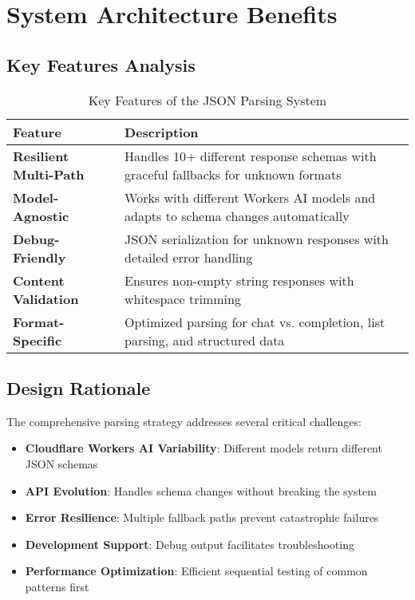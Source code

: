 \documentclass[11pt,a4paper]{article}
\begin{document}
\section{System Architecture Benefits}

\subsection{Key Features Analysis}

\begin{table}[h!]
\centering
\begin{tabular}{|p{3cm}|p{10cm}|}
\hline
\textbf{Feature} & \textbf{Description} \\
\hline
\textbf{Resilient Multi-Path} & Handles 10+ different response schemas with graceful fallbacks for unknown formats \\
\hline
\textbf{Model-Agnostic} & Works with different Workers AI models and adapts to schema changes automatically \\
\hline
\textbf{Debug-Friendly} & JSON serialization for unknown responses with detailed error handling \\
\hline
\textbf{Content Validation} & Ensures non-empty string responses with whitespace trimming \\
\hline
\textbf{Format-Specific} & Optimized parsing for chat vs. completion, list parsing, and structured data \\
\hline
\end{tabular}
\caption{Key Features of the JSON Parsing System}
\end{table}

\subsection{Design Rationale}

The comprehensive parsing strategy addresses several critical challenges:

\begin{itemize}
    \item \textbf{Cloudflare Workers AI Variability}: Different models return different JSON schemas
    \item \textbf{API Evolution}: Handles schema changes without breaking the system
    \item \textbf{Error Resilience}: Multiple fallback paths prevent catastrophic failures
    \item \textbf{Development Support}: Debug output facilitates troubleshooting
    \item \textbf{Performance Optimization}: Efficient sequential testing of common patterns first
\end{itemize}
\end{document}
